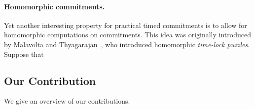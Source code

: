 \paragraph{Homomorphic commitments.}
Yet another interesting property for practical timed commitments is to allow for homomorphic computations on commitments. This idea was originally introduced by Malavolta and Thyagarajan~\cite{C:MalThy19}, who introduced homomorphic \emph{time-lock puzzles}. Suppose that








\subsection{Our Contribution}
We give an overview of our contributions. 
